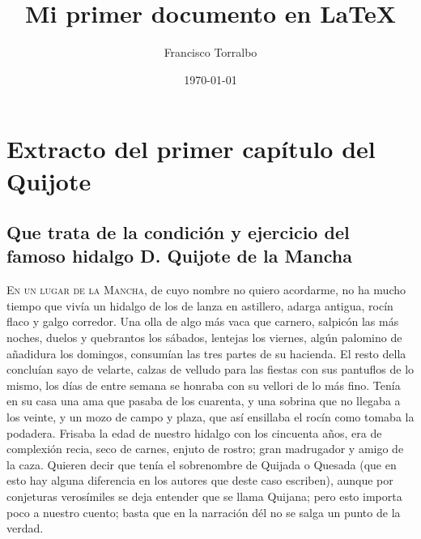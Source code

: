 \documentclass[a4paper, 12pt, twoside]{article} %
\title{Mi primer documento en \LaTeX}
\author{Francisco Torralbo}
\date{\today}
\begin{document}
\maketitle
\tableofcontents

\section{Extracto del primer capítulo del Quijote}

\subsection*{Que trata de la condición y ejercicio del famoso hidalgo D. Quijote de la Mancha}

\textsc{En un lugar de la Mancha}, de cuyo nombre no quiero acordarme, no ha mucho tiempo que vivía un hidalgo de los de lanza en astillero, adarga antigua, rocín flaco y galgo corredor. Una olla de algo más vaca que carnero, salpicón las más noches, duelos y quebrantos los sábados, lentejas los viernes, algún palomino de añadidura los domingos, consumían las tres partes de su hacienda. El resto della concluían sayo de velarte, calzas de velludo para las fiestas con sus pantuflos de lo mismo, los días de entre semana se honraba con su vellori de lo más fino. Tenía en su casa una ama que pasaba de los cuarenta, y una sobrina que no llegaba a los veinte, y un mozo de campo y plaza, que así ensillaba el rocín como tomaba la podadera. Frisaba la edad de nuestro hidalgo con los cincuenta años, era de complexión recia, seco de carnes, enjuto de rostro; gran madrugador y amigo de la caza. Quieren decir que tenía el sobrenombre de Quijada o Quesada (que en esto hay alguna diferencia en los autores que deste caso escriben), aunque por conjeturas verosímiles se deja entender que se llama Quijana; pero esto importa poco a nuestro cuento; basta que en la narración dél no se salga un punto de la verdad.
\end{document}
